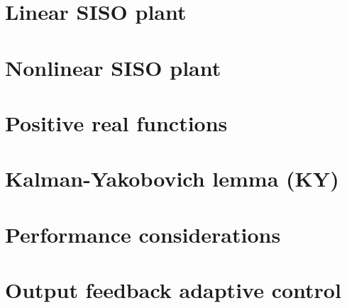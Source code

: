 \section{Linear SISO plant}


\section{Nonlinear SISO plant}


\section{Positive real functions}


\section{Kalman-Yakobovich lemma (KY)}


\section{Performance considerations}


\section{Output feedback adaptive control}


